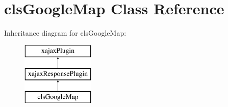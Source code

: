 \hypertarget{classclsGoogleMap}{
\section{clsGoogleMap Class Reference}
\label{classclsGoogleMap}
}
Inheritance diagram for clsGoogleMap:\begin{figure}[H]
\begin{center}
\leavevmode
\includegraphics[height=3.000000cm]{classclsGoogleMap}
\end{center}
\end{figure}
